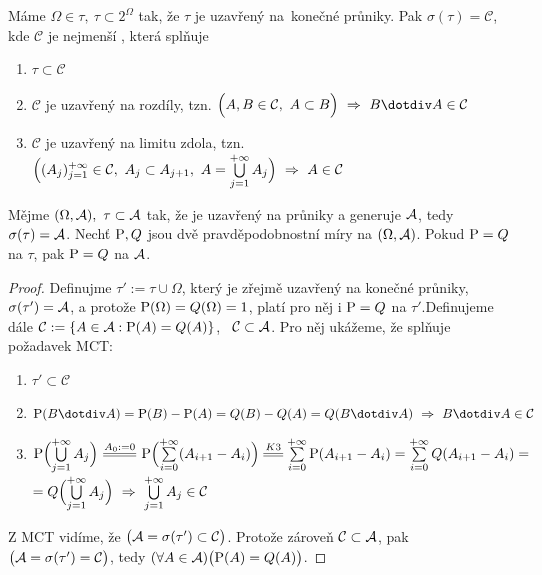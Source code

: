 \begin{theorem}
	Máme $\Omega\in\tau,~\tau \subset 2^\Omega$ tak, že $\tau$ je uzavřený na~konečné průniky. Pak $\sigma(\tau)=\mathcal{C}$, kde $\mathcal{C}$ je nejmenší \salg, která splňuje
	\begin{enumerate}
		\item $\tau \subset \mathcal{C}$
		\item $\mathcal{C}$ je uzavřený na rozdíly, tzn. $\Bigl(A,B \in \mathcal{C},~A \subset B \Bigr)~\Rightarrow~ B\dotdiv  A \in \mathcal{C}$
		\item $\mathcal{C}$ je uzavřený na limitu zdola, tzn. $\Bigl((A_j)_{j=1}^{+\infty} \in \mathcal{C},~A_j \subset A_{j+1},~A = \bigcup\limits_{j=1}^{+\infty} A_j \Bigr)~\Rightarrow~ A\in\mathcal{C}$
	\end{enumerate}
\end{theorem}
\begin{theorem}
	\label{Veta226}
	Mějme $(\Omega,\mathcal{A}),~\tau \subset \mathcal{A}$ tak, že je uzavřený na průniky a generuje $\mathcal{A}$, tedy $\sigma(\tau)=\mathcal{A}$. Nechť $\mathrm{P},Q$ jsou dvě pravděpodobnostní míry na $(\Omega,\mathcal{A})$. Pokud $\mathrm{P}=Q$ na $\tau$, pak $\mathrm{P}=Q$ na $\mathcal{A}$.
	 \begin{proof}
	 	Definujme $\tau':=\tau\cup \Omega$, který je zřejmě uzavřený na konečné průniky, $\sigma(\tau')=\mathcal{A}$, a protože $ \mathrm{P}(\Omega)=Q(\Omega)=1$, platí pro něj i $\mathrm{P}=Q$ na $\tau'$.\newline Definujeme dále $\mathcal{C}:=\{ A \in \mathcal{A}: \mathrm{P}(A)=Q(A) \}$,~ $\mathcal{C}\subset\mathcal{A}$.
	 	Pro něj ukážeme, že splňuje požadavek MCT:
	 	\begin{enumerate}
	 		\item $\tau' \subset \mathcal{C}$
	 		\item $\PP(B\dotdiv A)=\PP(B)-\PP(A)=Q(B)-Q(A)=Q(B\dotdiv A) ~\Rightarrow~ B\dotdiv A \in \mathcal{C}$
	 		\item $\PP\Bigl( \bigcup\limits_{j=1}^{+\infty} A_j \Bigr)\equal{A_0:=0} \PP\Bigl(\sum\limits_{i=0}^{+\infty}(A_{i+1}-A_i)\Bigr)\equal{K3} \sum\limits_{i=0}^{+\infty} \PP(A_{i+1}-A_i)=\sum\limits_{i=0}^{+\infty} Q(A_{i+1}-A_i)= $\newline$=Q\Bigl(\bigcup\limits_{j=1}^{+\infty} A_j\Bigr) ~\Rightarrow~ \bigcup\limits_{j=1}^{+\infty} A_j \in \mathcal{C}$
	 	\end{enumerate}
 	Z MCT vidíme, že $\bigl(\mathcal{A}=\sigma(\tau') \subset \mathcal{C}\bigr)$. Protože zároveň $\mathcal{C}\subset\mathcal{A}$, pak $\bigl( \mathcal{A}=\sigma(\tau')=\mathcal{C}\bigr)$, tedy $ (\forall A \in \mathcal{A} )\bigl(\mathrm{P}(A)=Q(A)\bigr)$.
	 \end{proof}
\end{theorem}

